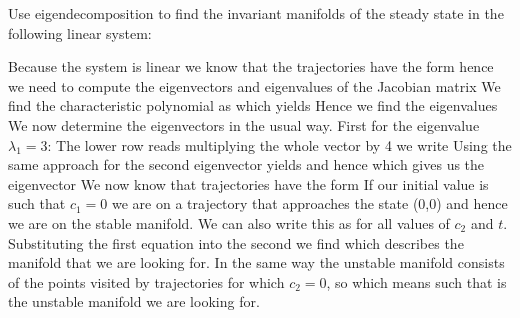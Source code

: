 Use eigendecomposition to find the invariant manifolds of the steady state in the following linear system:


\solution 
Because the system is linear we know that the trajectories have the form 
hence we need to compute the eigenvectors and eigenvalues of the Jacobian matrix 
We find the characteristic polynomial as 
which yields 
Hence we find the eigenvalues 
We now determine the eigenvectors in the usual way. First for the eigenvalue 
$\lambda_1=3$:
The lower row reads 
multiplying the whole vector by 4 we write 
Using the same approach for the second eigenvector yields
and hence 
which gives us the eigenvector 
We now know that trajectories have the form 
If our initial value is such that $c_1=0$ we are on a trajectory
that approaches the state (0,0) and hence we are on the stable manifold. We can also write this as 
for all values of $c_2$ and $t$. Substituting the first equation into the second we find 
which describes the manifold that we are looking for. In the same way the unstable manifold consists of the points visited by trajectories for which $c_2=0$, so 
which means  
such that 
is the unstable manifold we are looking for. 
